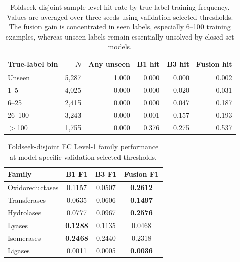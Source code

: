 \documentclass[11pt,a4paper]{article}
\begin{document}
\begin{table}[htbp]
\centering
\caption{Foldseek-disjoint sample-level hit rate by true-label training
frequency. Values are averaged over three seeds using validation-selected
thresholds. The fusion gain is concentrated in seen labels, especially 6--100
training examples, whereas unseen labels remain essentially unsolved by closed-set
models.}
\label{tab:foldseek_failure_bins}
\small
\setlength{\tabcolsep}{4pt}
\begin{tabular}{lrrrrr}
\toprule
True-label bin & $N$ & Any unseen & B1 hit & B3 hit & Fusion hit \\
\midrule
Unseen & 5{,}287 & 1.000 & 0.000 & 0.000 & 0.002 \\
1--5 & 4{,}025 & 0.000 & 0.000 & 0.020 & 0.031 \\
6--25 & 2{,}415 & 0.000 & 0.000 & 0.047 & 0.187 \\
26--100 & 3{,}243 & 0.000 & 0.001 & 0.157 & 0.193 \\
$>$100 & 1{,}755 & 0.000 & 0.376 & 0.275 & 0.537 \\
\bottomrule
\end{tabular}
\end{table}

\begin{table}[htbp]
\centering
\caption{Foldseek-disjoint EC Level-1 family performance at model-specific
validation-selected thresholds.}
\label{tab:foldseek_l1_family}
\small
\setlength{\tabcolsep}{4pt}
\begin{tabular}{lccc}
\toprule
Family & B1 F1 & B3 F1 & Fusion F1 \\
\midrule
Oxidoreductases & 0.1157 & 0.0507 & \textbf{0.2612} \\
Transferases & 0.0635 & 0.0606 & \textbf{0.1497} \\
Hydrolases & 0.0777 & 0.0967 & \textbf{0.2576} \\
Lyases & \textbf{0.1288} & 0.1135 & 0.0468 \\
Isomerases & \textbf{0.2468} & 0.2440 & 0.2318 \\
Ligases & 0.0011 & 0.0005 & \textbf{0.0036} \\
\bottomrule
\end{tabular}
\end{table}
\end{document}
